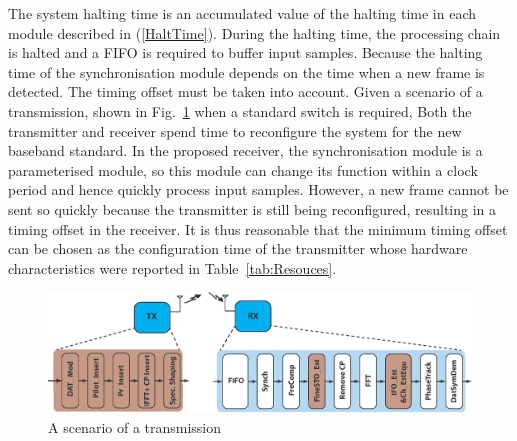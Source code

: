The system halting time is an accumulated value of the halting time in each module described in (\ref{HaltTime}). During the halting time, the processing chain is halted and a FIFO is required to buffer input samples. Because the halting time of the synchronisation module depends on the time when a new frame is detected. The timing offset must be taken into account. Given a scenario of a transmission, shown in Fig.~\ref{fig:tx-rx} when a standard switch is required, Both the transmitter and receiver spend time to reconfigure the system for the new baseband standard. In the proposed receiver, the synchronisation module is a parameterised module, so this module can change its function within a clock period and hence quickly process input samples. However, a new frame cannot be sent so quickly because the transmitter is still being reconfigured, resulting in a timing offset in the receiver. It is thus reasonable that the minimum timing offset can be chosen as the configuration time of the transmitter whose hardware characteristics were reported in Table~\ref{tab:Resouces}.
\begin{figure}
\centering
\includegraphics [width=1\columnwidth]{Figures/CR_Tx-Rx.eps}
\caption{A scenario of a transmission}
\label{fig:tx-rx}
\end{figure}

